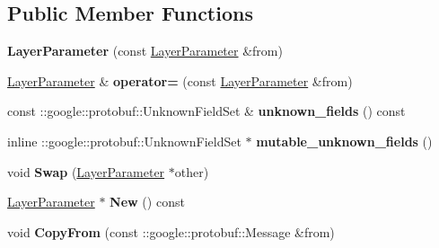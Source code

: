 \subsection*{Public Member Functions}
\begin{DoxyCompactItemize}
\item 
\mbox{\label{classcaffe_1_1_layer_parameter_af1f2b1c82ed898f06f7652e8638287d9}} 
{\bfseries Layer\+Parameter} (const \mbox{\hyperlink{classcaffe_1_1_layer_parameter}{Layer\+Parameter}} \&from)
\item 
\mbox{\label{classcaffe_1_1_layer_parameter_ad693650b871f5ecd2e89e9626a414deb}} 
\mbox{\hyperlink{classcaffe_1_1_layer_parameter}{Layer\+Parameter}} \& {\bfseries operator=} (const \mbox{\hyperlink{classcaffe_1_1_layer_parameter}{Layer\+Parameter}} \&from)
\item 
\mbox{\label{classcaffe_1_1_layer_parameter_a672adc76180ccb213a75d4583666715d}} 
const \+::google\+::protobuf\+::\+Unknown\+Field\+Set \& {\bfseries unknown\+\_\+fields} () const
\item 
\mbox{\label{classcaffe_1_1_layer_parameter_a6b572023f9ef350f7476ba55fc4f5489}} 
inline \+::google\+::protobuf\+::\+Unknown\+Field\+Set $\ast$ {\bfseries mutable\+\_\+unknown\+\_\+fields} ()
\item 
\mbox{\label{classcaffe_1_1_layer_parameter_a24454ba17a6dbd76f98047ed7191d242}} 
void {\bfseries Swap} (\mbox{\hyperlink{classcaffe_1_1_layer_parameter}{Layer\+Parameter}} $\ast$other)
\item 
\mbox{\label{classcaffe_1_1_layer_parameter_a8a7b41da113266fef6c59de9b5551cf1}} 
\mbox{\hyperlink{classcaffe_1_1_layer_parameter}{Layer\+Parameter}} $\ast$ {\bfseries New} () const
\item 
\mbox{\label{classcaffe_1_1_layer_parameter_af47289b21b23575e3ed411b13c6c2304}} 
void {\bfseries Copy\+From} (const \+::google\+::protobuf\+::\+Message \&from)
\item 
\mbox{\label{classcaffe_1_1_layer_parameter_a849a7e68e81dde0863b72aebb4adf83e}} 

\end{DoxyCompactItemize}
